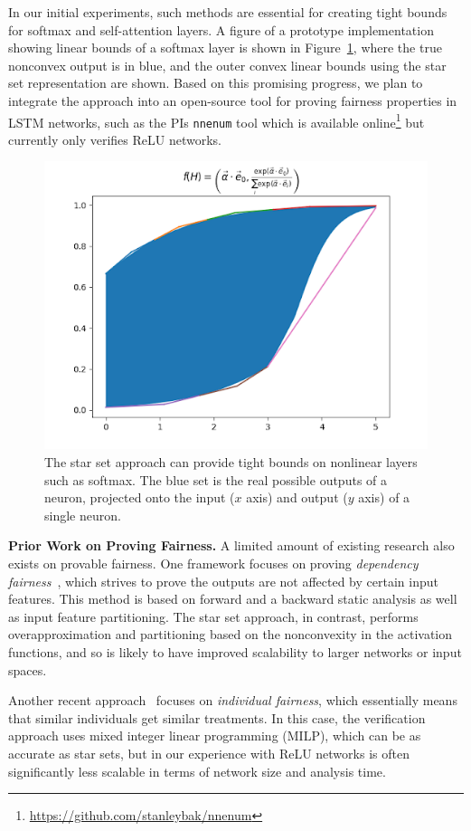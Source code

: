 \documentclass[11pt]{article}
\begin{document}
In our initial experiments, such methods are essential for creating tight bounds for softmax and self-attention layers.
%
A figure of a prototype implementation showing linear bounds of a softmax layer is shown in Figure~\ref{fig:softmax}, where the true nonconvex output is in blue, and the outer convex linear bounds using the star set representation are shown.
%
Based on this promising progress, we plan to integrate the approach into an open-source tool for proving fairness properties in LSTM networks, such as the PIs \texttt{nnenum} tool\cite{bak2021nnenum} which is available online\footnote{\url{https://github.com/stanleybak/nnenum}} but currently only verifies ReLU networks.

\begin{figure}[t]
    \centering
    \includegraphics[width=0.5\columnwidth]{figs/softmax.png}
    \caption{The star set approach can provide tight bounds on nonlinear layers such as softmax. The blue set is the real possible outputs of a neuron, projected onto the input ($x$ axis) and output ($y$ axis) of a single neuron.}
    \label{fig:softmax}
\end{figure}

\vspace{1em}
\noindent
\textbf{Prior Work on Proving Fairness. } 
%
A limited amount of existing research also exists on provable fairness.
%
One framework focuses on proving \emph{dependency
fairness}~\cite{urban2020perfectly,galhotra2017fairness}, which strives to prove the outputs are not affected by certain input features.
%
This method is based on forward and a backward static analysis as well as input feature partitioning.
%
The star set approach, in contrast, performs overapproximation and partitioning based on the nonconvexity in the activation functions, and so is likely to have improved scalability to larger networks or input spaces.

Another recent approach~\cite{ruoss2020learning} focuses on \emph{individual fairness}, which essentially means that similar individuals get similar treatments.
%
In this case, the verification approach uses mixed integer linear programming (MILP), which can be as accurate as star sets, but in our experience with ReLU networks is often significantly less scalable in terms of network size and analysis time.
\end{document}
